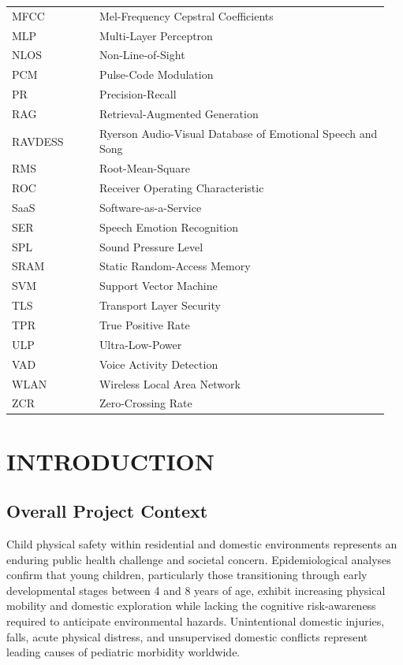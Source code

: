\documentclass[12pt, a4paper]{report}
\begin{document}
\begin{longtable}{@{} p{0.22\linewidth} p{0.73\linewidth} @{}}
MFCC & Mel-Frequency Cepstral Coefficients \\
MLP & Multi-Layer Perceptron \\
NLOS & Non-Line-of-Sight \\
PCM & Pulse-Code Modulation \\
PR & Precision-Recall \\
RAG & Retrieval-Augmented Generation \\
RAVDESS & Ryerson Audio-Visual Database of Emotional Speech and Song \\
RMS & Root-Mean-Square \\
ROC & Receiver Operating Characteristic \\
SaaS & Software-as-a-Service \\
SER & Speech Emotion Recognition \\
SPL & Sound Pressure Level \\
SRAM & Static Random-Access Memory \\
SVM & Support Vector Machine \\
TLS & Transport Layer Security \\
TPR & True Positive Rate \\
ULP & Ultra-Low-Power \\
VAD & Voice Activity Detection \\
WLAN & Wireless Local Area Network \\
ZCR & Zero-Crossing Rate \\
\bottomrule
\end{longtable}

\clearpage

\setcounter{page}{1}

\chapter{INTRODUCTION}

\section{Overall Project Context}
Child physical safety within residential and domestic environments represents an enduring public health challenge and societal concern. Epidemiological analyses confirm that young children, particularly those transitioning through early developmental stages between 4 and 8 years of age, exhibit increasing physical mobility and domestic exploration while lacking the cognitive risk-awareness required to anticipate environmental hazards. Unintentional domestic injuries, falls, acute physical distress, and unsupervised domestic conflicts represent leading causes of pediatric morbidity worldwide.
\end{document}
